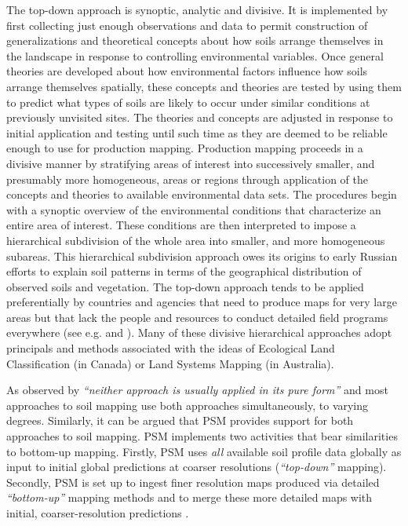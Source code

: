 \documentclass[graybox,natbib,nospthms,UStrade]{svmono}
\begin{document}
The top-down approach is synoptic, analytic and divisive. It is
implemented by first collecting just enough observations and data to
permit construction of generalizations and theoretical concepts about
how soils arrange themselves in the landscape in response to controlling
environmental variables. Once general theories are developed about how
environmental factors influence how soils arrange themselves spatially,
these concepts and theories are tested by using them to predict what
types of soils are likely to occur under similar conditions at
previously unvisited sites. The theories and concepts are adjusted in
response to initial application and testing until such time as they are
deemed to be reliable enough to use for production mapping. Production
mapping proceeds in a divisive manner by stratifying areas of interest
into successively smaller, and presumably more homogeneous, areas or
regions through application of the concepts and theories to available
environmental data sets. The procedures begin with a synoptic overview
of the environmental conditions that characterize an entire area of
interest. These conditions are then interpreted to impose a hierarchical
subdivision of the whole area into smaller, and more homogeneous
subareas. This hierarchical subdivision approach owes its origins to
early Russian efforts to explain soil patterns in terms of the
geographical distribution of observed soils and vegetation. The top-down approach tends
to be applied preferentially by countries and agencies that need to
produce maps for very large areas but that lack the people and resources
to conduct detailed field programs everywhere (see e.g.
\citet{Henderson2004Geoderma} and \citet{Mansuy201459}). Many of these divisive
hierarchical approaches adopt principals and methods associated with the
ideas of Ecological Land Classification \citep{rowe1981ecological} (in
Canada) or Land Systems Mapping \citep{gibbons1964study, rowan1990land} (in
Australia).

As observed by \citet{Rossiter2001} \emph{``neither approach is usually applied in
its pure form''} and most approaches to soil mapping use both approaches
simultaneously, to varying degrees. Similarly, it can be argued that PSM provides
support for both approaches to soil mapping. PSM implements two
activities that bear similarities to bottom-up mapping. Firstly, PSM
uses \emph{all} available soil profile data globally as input to initial
global predictions at coarser resolutions (\emph{``top-down''} mapping).
Secondly, PSM is set up to ingest finer resolution maps produced via
detailed \emph{``bottom-up''} mapping methods and to merge these more detailed
maps with initial, coarser-resolution predictions \citep{ramcharan2018soil}.
\end{document}
